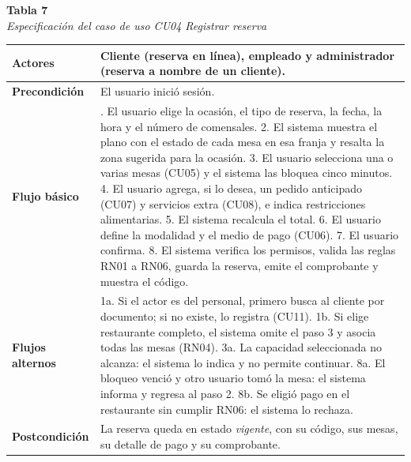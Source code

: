 \documentclass[12pt]{article}
\begin{document}
\begin{center}{\small\textbf{Tabla 7}}\\{\small\textit{Especificaci{\'o}n del caso de uso CU04 Registrar reserva}}\end{center}
\begin{longtable}{|p{2.8cm}|>{\raggedright\arraybackslash}p{10.2cm}|}\hline
\textbf{Actores} & Cliente (reserva en l{\'i}nea), empleado y administrador (reserva a nombre de un cliente).\\\hline
\textbf{Precondici{\'o}n} & El usuario inici{\'o} sesi{\'o}n.\\\hline
\textbf{Flujo b{\'a}sico} & 1. El usuario elige la ocasi{\'o}n, el tipo de reserva, la fecha, la hora y el n{\'u}mero de comensales. 2. El sistema muestra el plano con el estado de cada mesa en esa franja y resalta la zona sugerida para la ocasi{\'o}n. 3. El usuario selecciona una o varias mesas (CU05) y el sistema las bloquea cinco minutos. 4. El usuario agrega, si lo desea, un pedido anticipado (CU07) y servicios extra (CU08), e indica restricciones alimentarias. 5. El sistema recalcula el total. 6. El usuario define la modalidad y el medio de pago (CU06). 7. El usuario confirma. 8. El sistema verifica los permisos, valida las reglas RN01 a RN06, guarda la reserva, emite el comprobante y muestra el c{\'o}digo.\\\hline
\textbf{Flujos alternos} & 1a. Si el actor es del personal, primero busca al cliente por documento; si no existe, lo registra (CU11). 1b. Si elige restaurante completo, el sistema omite el paso 3 y asocia todas las mesas (RN04). 3a. La capacidad seleccionada no alcanza: el sistema lo indica y no permite continuar. 8a. El bloqueo venci{\'o} y otro usuario tom{\'o} la mesa: el sistema informa y regresa al paso 2. 8b. Se eligi{\'o} pago en el restaurante sin cumplir RN06: el sistema lo rechaza.\\\hline
\textbf{Postcondici{\'o}n} & La reserva queda en estado \textit{vigente}, con su c{\'o}digo, sus mesas, su detalle de pago y su comprobante.\\\hline
\end{longtable}
\end{document}
